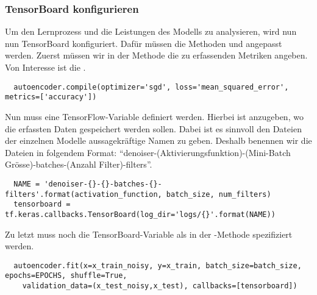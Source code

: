 \subsubsection{TensorBoard konfigurieren}
Um den Lernprozess und die Leistungen des Modells zu analysieren,
wird nun nun TensorBoard konfiguriert.
Dafür müssen die Methoden  und  angepasst werden.
Zuerst müssen wir in der  Methode die zu erfassenden Metriken
angeben. Von Interesse ist die .
\begin{verbatim}
  autoencoder.compile(optimizer='sgd', loss='mean_squared_error', metrics=['accuracy'])
\end{verbatim}
Nun muss eine TensorFlow-Variable definiert werden. Hierbei ist anzugeben, wo
die erfassten Daten gespeichert werden sollen. Dabei ist es sinnvoll den Dateien
der einzelnen Modelle aussagekräftige Namen zu geben. Deshalb benennen wir die
Dateien in folgendem Format: ``denoiser-(Aktivierungsfunktion)-(Mini-Batch
Grösse)-batches-(Anzahl Filter)-filters''.
\begin{verbatim}
  NAME = 'denoiser-{}-{}-batches-{}-filters'.format(activation_function, batch_size, num_filters)
  tensorboard = tf.keras.callbacks.TensorBoard(log_dir='logs/{}'.format(NAME))
\end{verbatim}
Zu letzt muss noch die TensorBoard-Variable als  in der
-Methode spezifiziert werden.
\begin{verbatim}
  autoencoder.fit(x=x_train_noisy, y=x_train, batch_size=batch_size, epochs=EPOCHS, shuffle=True,
    validation_data=(x_test_noisy,x_test), callbacks=[tensorboard])
\end{verbatim}

